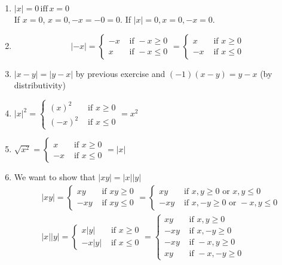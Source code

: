 \documentclass[twoside]{amsart}
\theoremstyle{plain}
\theoremstyle{definition}
\newcommand{\exercisehead}[1]
  {\smallskip
   \noindent{\small\bf Exercise #1.}}
\begin{document}
\exercisehead{1} 
\begin{enumerate}
\item $|x| = 0 \,  \text{iff} \,  x = 0 $  \\
  If $x=0$, $x = 0 , -x = -0 = 0$.  If $|x|=0, x=0 , -x = 0$.  
\item \[
  |-x| = \begin{cases} -x & \text{ if } -x \geq 0  \\  x & \text{ if } -x \leq 0 \end{cases} = \begin{cases} x & \text{ if } x \geq 0 \\  -x & \text{ if } x \leq 0 \end{cases}
\]
\item $|x-y|=|y-x|$ by previous exercise and $(-1)(x-y) = y-x$ (by distributivity)
\item $|x|^2 = \begin{cases} (x)^2 & \text{ if } x \geq 0 \\ (-x)^2 & \text{ if } x \leq 0 \end{cases} = x^2 $ 
\item $\sqrt{x^2} = \begin{cases} x & \text{ if } x \geq 0 \\  -x & \text{ if } x \leq 0 \end{cases} = |x|  $
\item We want to show that $|xy| = |x||y|$  
\[
\begin{aligned}
& |xy| = \begin{cases} xy & \text{ if } xy \geq 0  \\ -xy & \text{ if } xy \leq 0 \end{cases}  = \begin{cases} xy & \text{ if } x,y \geq 0 \text{ or } x,y \leq 0 \\  -xy & \text{ if } x,-y \geq 0 \text{ or } -x,y \leq 0 \end{cases} \\
& |x||y| = \begin{cases}  x|y| & \text{ if } x\geq 0 \\  -x|y| & \text{ if } x\leq 0 \end{cases} = \begin{cases} xy & \text{ if } x,y \geq 0 \\ -xy & \text{ if } x,-y \geq 0 \\ -xy & \text{ if } -x,y \geq 0 \\ xy & \text{ if } -x,-y \geq 0 \end{cases} 

\end{aligned}\]
\end{enumerate}
\end{document}
